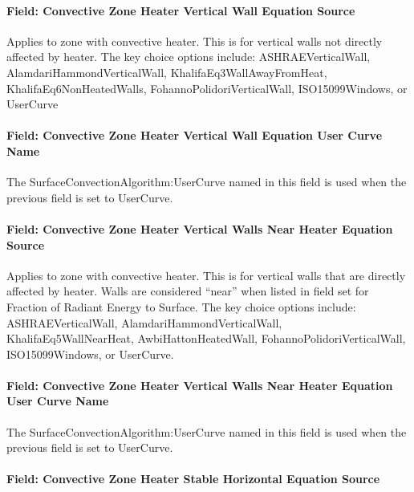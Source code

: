 \paragraph{Field: Convective Zone Heater Vertical Wall Equation Source}\label{field-convective-zone-heater-vertical-wall-equation-source}

Applies to zone with convective heater. This is for vertical walls not directly affected by heater. The key choice options include: ASHRAEVerticalWall, AlamdariHammondVerticalWall, KhalifaEq3WallAwayFromHeat, KhalifaEq6NonHeatedWalls, FohannoPolidoriVerticalWall, ISO15099Windows, or UserCurve

\paragraph{Field: Convective Zone Heater Vertical Wall Equation User Curve Name}\label{field-convective-zone-heater-vertical-wall-equation-user-curve-name}

The SurfaceConvectionAlgorithm:UserCurve named in this field is used when the previous field is set to UserCurve.

\paragraph{Field: Convective Zone Heater Vertical Walls Near Heater Equation Source}\label{field-convective-zone-heater-vertical-walls-near-heater-equation-source}

Applies to zone with convective heater. This is for vertical walls that are directly affected by heater. Walls are considered ``near'' when listed in field set for Fraction of Radiant Energy to Surface. The key choice options include: ASHRAEVerticalWall, AlamdariHammondVerticalWall, KhalifaEq5WallNearHeat, AwbiHattonHeatedWall, FohannoPolidoriVerticalWall, ISO15099Windows, or UserCurve.

\paragraph{Field: Convective Zone Heater Vertical Walls Near Heater Equation User Curve Name}\label{field-convective-zone-heater-vertical-walls-near-heater-equation-user-curve-name}

The SurfaceConvectionAlgorithm:UserCurve named in this field is used when the previous field is set to UserCurve.

\paragraph{Field: Convective Zone Heater Stable Horizontal Equation Source}\label{field-convective-zone-heater-stable-horizontal-equation-source}

